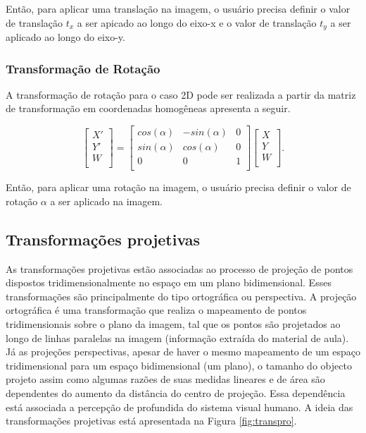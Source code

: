 \documentclass{article}
\begin{document}
\noindent
Então, para aplicar uma translação na imagem, o usuário precisa definir o valor de translação $t_x$ a ser apicado ao longo do eixo-x e o valor de translação $t_y$ a ser aplicado ao longo do eixo-y.

\subsubsection{Transformação de Rotação} 
A transformação de rotação para o caso 2D pode ser realizada a partir da matriz de transformação em coordenadas homogêneas apresenta a seguir.

\begin{equation}
\begin{bmatrix} 
X'\\
Y'\\
W \\
\end{bmatrix}
=
\begin{bmatrix} 
cos(\alpha) & -sin(\alpha) & 0 \\
sin(\alpha) & cos(\alpha)  & 0 \\
0           & 0            & 1 \\
\end{bmatrix}
%
\begin{bmatrix} 
X \\
Y \\
W \\
\end{bmatrix}.
\label{eq:transrot}
\end{equation}

\noindent
Então, para aplicar uma rotação na imagem, o usuário precisa definir o valor de rotação $\alpha$ a ser aplicado na imagem.

\subsection{Transformações projetivas}
As transformações projetivas estão associadas ao processo de projeção de pontos dispostos tridimensionalmente no espaço em um plano bidimensional. Esses transformações são principalmente do tipo ortográfica ou perspectiva. A projeção ortográfica é uma transformação que realiza o mapeamento de pontos tridimensionais sobre o plano da imagem, tal que os pontos são projetados ao longo de linhas paralelas na imagem (informação extraída do material de aula). Já as projeções perspectivas, apesar de haver o mesmo mapeamento de um espaço tridimensional para um espaço bidimensional (um plano), o tamanho do objecto projeto assim como algumas razões de suas medidas lineares e de área são dependentes do aumento da distância do centro de projeção. Essa dependência está associada a percepção de profundida do sistema visual humano. A ideia das transformações projetivas está apresentada na Figura \ref{fig:transpro}.
\end{document}
